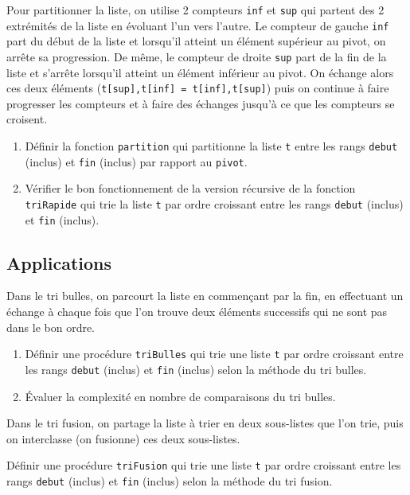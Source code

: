 Pour partitionner la liste, on utilise 2 compteurs {\tt inf} et {\tt sup} qui partent des
2 extrémités de la liste en évoluant l'un vers l'autre.
Le compteur de gauche {\tt inf} part du début de la liste et lorsqu'il atteint un élément 
supérieur au pivot, on arrête sa progression. De même, le compteur de droite {\tt sup}
part de la fin de la liste et s'arrête lorsqu'il atteint un élément inférieur au pivot.
On échange alors ces deux éléments ({\tt t[sup],t[inf] = t[inf],t[sup]}) puis on continue
à faire progresser les compteurs et à faire des échanges jusqu'à ce que les compteurs se
croisent.

\begin{question}\mbox{}
\begin{enumerate}
\item Définir la fonction \texttt{partition} qui partitionne la liste \texttt{t} entre les 
	rangs \texttt{debut} (inclus) et \texttt{fin} (inclus) par rapport au \texttt{pivot}.
\item Vérifier le bon fonctionnement de la version récursive de la fonction
	\texttt{triRapide} qui trie la liste \texttt{t} par ordre croissant entre les rangs
	\texttt{debut} (inclus) et \texttt{fin} (inclus).
\end{enumerate}
\end{question}

\subsection{Applications}
\begin{question}\mbox{}
Dans le tri bulles, on parcourt la liste en commençant par la fin, 
en effectuant un échange à chaque fois que l'on trouve deux éléments 
successifs qui ne sont pas dans le bon ordre.
\begin{enumerate}
\item Définir une procédure \texttt{triBulles} qui trie une liste \texttt{t} par ordre 
	croissant entre les rangs \texttt{debut} (inclus) et \texttt{fin} (inclus) 
	selon la méthode du tri bulles.
\item Évaluer la complexité en nombre de comparaisons du tri bulles.
\end{enumerate}
\end{question}

\begin{question}\mbox{}
Dans le tri fusion, on partage la liste à trier en deux sous-listes que l'on trie,
puis on interclasse (on fusionne) ces deux sous-listes.

Définir une procédure \texttt{triFusion} qui trie une liste \texttt{t} par ordre 
	croissant entre les rangs \texttt{debut} (inclus) et \texttt{fin} (inclus) 
	selon la méthode du tri fusion.
\end{question}


